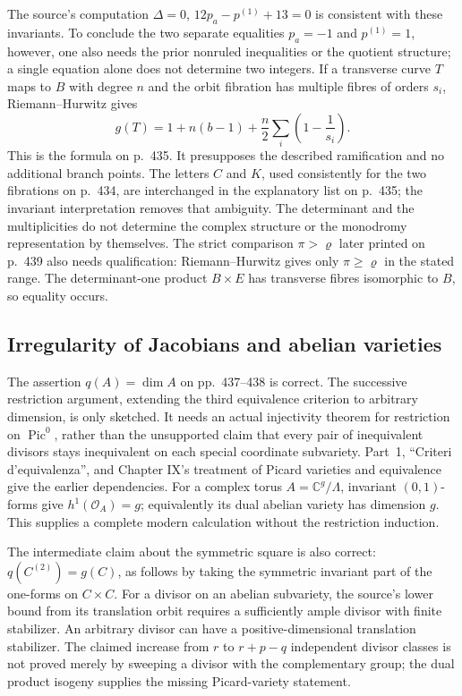 The source's computation \(\Delta=0\), \(12p_a-p^{(1)}+13=0\) is consistent with these invariants. To conclude the two separate equalities \(p_a=-1\) and \(p^{(1)}=1\), however, one also needs the prior nonruled inequalities or the quotient structure; a single equation alone does not determine two integers. If a transverse curve \(T\) maps to \(B\) with degree \(n\) and the orbit fibration has multiple fibres of orders \(s_i\), Riemann--Hurwitz gives
\[
g(T)=1+n(b-1)+\frac n2\sum_i\left(1-\frac1{s_i}\right).
\]
This is the formula on p.~435. It presupposes the described ramification and no additional branch points. The letters \(C\) and \(K\), used consistently for the two fibrations on p.~434, are interchanged in the explanatory list on p.~435; the invariant interpretation removes that ambiguity. The determinant and the multiplicities do not determine the complex structure or the monodromy representation by themselves. The strict comparison \(\pi>\varrho\) later printed on p.~439 also needs qualification: Riemann--Hurwitz gives only \(\pi\ge\varrho\) in the stated range. The determinant-one product \(B\times E\) has transverse fibres isomorphic to \(B\), so equality occurs.

\subsection{Irregularity of Jacobians and abelian varieties}

The assertion \(q(A)=\dim A\) on pp.~437--438 is correct. The successive restriction argument, extending the third equivalence criterion to arbitrary dimension, is only sketched. It needs an actual injectivity theorem for restriction on \(\operatorname{Pic}^0\), rather than the unsupported claim that every pair of inequivalent divisors stays inequivalent on each special coordinate subvariety. Part~1, ``Criteri d'equivalenza'', and Chapter IX's treatment of Picard varieties and equivalence give the earlier dependencies. For a complex torus \(A=\mathbb C^g/\Lambda\), invariant \((0,1)\)-forms give \(h^1(\mathcal O_A)=g\); equivalently its dual abelian variety has dimension \(g\). This supplies a complete modern calculation without the restriction induction.

The intermediate claim about the symmetric square is also correct: \(q(C^{(2)})=g(C)\), as follows by taking the symmetric invariant part of the one-forms on \(C\times C\). For a divisor on an abelian subvariety, the source's lower bound from its translation orbit requires a sufficiently ample divisor with finite stabilizer. An arbitrary divisor can have a positive-dimensional translation stabilizer. The claimed increase from \(r\) to \(r+p-q\) independent divisor classes is not proved merely by sweeping a divisor with the complementary group; the dual product isogeny supplies the missing Picard-variety statement.


